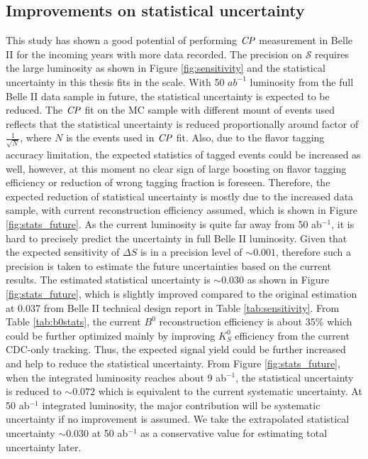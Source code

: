 \subsection{Improvements on statistical uncertainty}
This study has shown a good potential of performing $\it{CP}$ measurement in Belle II for the incoming years with more data recorded. The precision on $\mathcal{S}$ requires the large luminosity as shown in Figure \ref{fig:sensitivity} and the statistical uncertainty in this thesis fits in the scale. With 50 $ab^{-1}$ luminosity from the full Belle II data sample in future, the statistical uncertainty is expected to be reduced. The $\it{CP}$ fit on the MC sample with different mount of events used reflects that the statistical uncertainty is reduced proportionally around factor of $\frac{1}{\sqrt{N}}$, where $N$ is the events used in $\it{CP}$ fit. Also, due to the flavor tagging accuracy limitation, the expected statistics of tagged events could be increased as well, however, at this moment no clear sign of large boosting on flavor tagging efficiency or reduction of wrong tagging fraction is foreseen. Therefore, the expected reduction of statistical uncertainty is mostly due to the increased data sample, with current reconstruction efficiency assumed, which is shown in Figure \ref{fig:stats_future}.  As the current luminosity is quite far away from 50 ab$^{-1}$, it is hard to precisely predict the uncertainty in full Belle II luminosity. Given that the expected sensitivity of $\Delta S$ is in a precision level of $\sim 0.001$, therefore such a precision is taken to estimate the future uncertainties based on the current results. The estimated statistical uncertainty is  $\sim 0.030$ as shown in Figure \ref{fig:stats_future}, which is slightly improved compared to the original estimation at 0.037 from Belle II technical design report in Table \ref{tab:sensitivity}. From Table \ref{tab:b0stats}, the current $B^0$ reconstruction efficiency is about 35\% which could be further optimized mainly by improving $K_S^0$ efficiency from the current CDC-only tracking. Thus, the expected signal yield could be further increased and help to reduce the statistical uncertainty. From Figure \ref{fig:stats_future}, when the integrated luminosity reaches about 9 ab$^{-1}$, the statistical uncertainty is reduced to $\sim 0.072$ which is equivalent to the current systematic uncertainty. At 50 ab$^{-1}$ integrated luminosity, the major contribution will be systematic uncertainty if no improvement is assumed. We take the extrapolated statistical uncertainty $\sim 0.030$ at 50 ab$^{-1}$ as a conservative value for estimating total uncertainty later.

